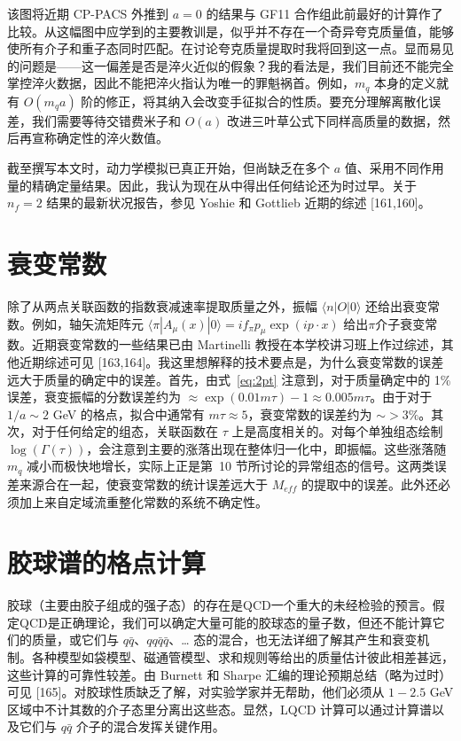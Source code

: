 该图将近期 CP-PACS 外推到 $a = 0$ 的结果与 GF11 合作组此前最好的计算作了比较。从这幅图中应学到的主要教训是，似乎并不存在一个奇异夸克质量值，能够使所有介子和重子态同时匹配。在讨论夸克质量提取时我将回到这一点。显而易见的问题是——这一偏差是否是淬火近似的假象？我的看法是，我们目前还不能完全掌控淬火数据，因此不能把淬火指认为唯一的罪魁祸首。例如，$m_q$ 本身的定义就有 $O(m_q a)$ 阶的修正，将其纳入会改变手征拟合的性质。要充分理解离散化误差，我们需要等待交错费米子和 $O(a)$ 改进三叶草公式下同样高质量的数据，然后再宣称确定性的淬火数值。

截至撰写本文时，动力学模拟已真正开始，但尚缺乏在多个 $a$ 值、采用不同作用量的精确定量结果。因此，我认为现在从中得出任何结论还为时过早。关于 $n_f = 2$ 结果的最新状况报告，参见 Yoshie 和 Gottlieb 近期的综述 [161,160]。

\section{衰变常数}

除了从两点关联函数的指数衰减速率提取质量之外，振幅 $\langle n | O | 0 \rangle$ 还给出衰变常数。例如，轴矢流矩阵元 $\langle \pi | A_\mu(x) | 0 \rangle = i f_\pi p_\mu \exp(i p \cdot x)$ 给出$\pi$介子衰变常数。近期衰变常数的一些结果已由 Martinelli 教授在本学校讲习班上作过综述，其他近期综述可见 [163,164]。我这里想解释的技术要点是，为什么衰变常数的误差远大于质量的确定中的误差。首先，由式~\eqref{eq:2pt} 注意到，对于质量确定中的 1\% 误差，衰变振幅的分数误差约为 $\approx \exp(0.01 m \tau) - 1 \approx 0.005 m \tau$。由于对于 $1/a \sim 2$ GeV 的格点，拟合中通常有 $m\tau \approx 5$，衰变常数的误差约为 $\sim > 3\%$。其次，对于任何给定的组态，关联函数在 $\tau$ 上是高度相关的。对每个单独组态绘制 $\log(\Gamma(\tau))$，会注意到主要的涨落出现在整体归一化中，即振幅。这些涨落随 $m_q$ 减小而极快地增长，实际上正是第~10 节所讨论的异常组态的信号。这两类误差来源合在一起，使衰变常数的统计误差远大于 $M_{eff}$ 的提取中的误差。此外还必须加上来自定域流重整化常数的系统不确定性。

\section{胶球谱的格点计算}

胶球（主要由胶子组成的强子态）的存在是QCD一个重大的未经检验的预言。假定QCD是正确理论，我们可以确定大量可能的胶球态的量子数，但还不能计算它们的质量，或它们与 $q\bar{q}$、$qq\bar{q}\bar{q}$、\ldots{} 态的混合，也无法详细了解其产生和衰变机制。各种模型如袋模型、磁通管模型、求和规则等给出的质量估计彼此相差甚远，这些计算的可靠性较差。由 Burnett 和 Sharpe 汇编的理论预期总结（略为过时）可见 [165]。对胶球性质缺乏了解，对实验学家并无帮助，他们必须从 $1-2.5$ GeV 区域中不计其数的介子态里分离出这些态。显然，LQCD 计算可以通过计算谱以及它们与 $q\bar{q}$ 介子的混合发挥关键作用。

